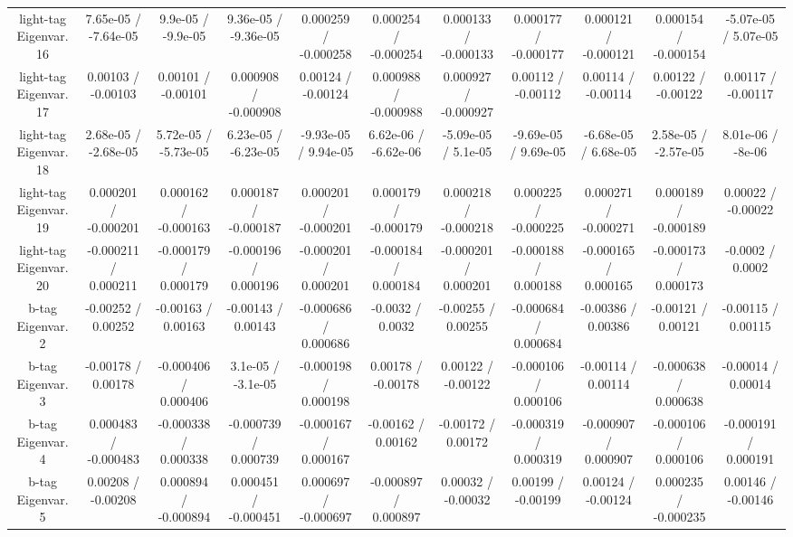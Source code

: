 \begin{table}[htbp]
\begin{center}
\begin{tabular}{|c|c|c|c|c|c|c|c|c|c|c|}
  light-tag Eigenvar. 16 & 7.65e-05 / -7.64e-05 & 9.9e-05 / -9.9e-05 & 9.36e-05 / -9.36e-05 & 0.000259 / -0.000258 & 0.000254 / -0.000254 & 0.000133 / -0.000133 & 0.000177 / -0.000177 & 0.000121 / -0.000121 & 0.000154 / -0.000154 & -5.07e-05 / 5.07e-05 \\ 
  light-tag Eigenvar. 17 & 0.00103 / -0.00103 & 0.00101 / -0.00101 & 0.000908 / -0.000908 & 0.00124 / -0.00124 & 0.000988 / -0.000988 & 0.000927 / -0.000927 & 0.00112 / -0.00112 & 0.00114 / -0.00114 & 0.00122 / -0.00122 & 0.00117 / -0.00117 \\ 
  light-tag Eigenvar. 18 & 2.68e-05 / -2.68e-05 & 5.72e-05 / -5.73e-05 & 6.23e-05 / -6.23e-05 & -9.93e-05 / 9.94e-05 & 6.62e-06 / -6.62e-06 & -5.09e-05 / 5.1e-05 & -9.69e-05 / 9.69e-05 & -6.68e-05 / 6.68e-05 & 2.58e-05 / -2.57e-05 & 8.01e-06 / -8e-06 \\ 
  light-tag Eigenvar. 19 & 0.000201 / -0.000201 & 0.000162 / -0.000163 & 0.000187 / -0.000187 & 0.000201 / -0.000201 & 0.000179 / -0.000179 & 0.000218 / -0.000218 & 0.000225 / -0.000225 & 0.000271 / -0.000271 & 0.000189 / -0.000189 & 0.00022 / -0.00022 \\ 
  light-tag Eigenvar. 20 & -0.000211 / 0.000211 & -0.000179 / 0.000179 & -0.000196 / 0.000196 & -0.000201 / 0.000201 & -0.000184 / 0.000184 & -0.000201 / 0.000201 & -0.000188 / 0.000188 & -0.000165 / 0.000165 & -0.000173 / 0.000173 & -0.0002 / 0.0002 \\ 
  b-tag Eigenvar. 2 & -0.00252 / 0.00252 & -0.00163 / 0.00163 & -0.00143 / 0.00143 & -0.000686 / 0.000686 & -0.0032 / 0.0032 & -0.00255 / 0.00255 & -0.000684 / 0.000684 & -0.00386 / 0.00386 & -0.00121 / 0.00121 & -0.00115 / 0.00115 \\ 
  b-tag Eigenvar. 3 & -0.00178 / 0.00178 & -0.000406 / 0.000406 & 3.1e-05 / -3.1e-05 & -0.000198 / 0.000198 & 0.00178 / -0.00178 & 0.00122 / -0.00122 & -0.000106 / 0.000106 & -0.00114 / 0.00114 & -0.000638 / 0.000638 & -0.00014 / 0.00014 \\ 
  b-tag Eigenvar. 4 & 0.000483 / -0.000483 & -0.000338 / 0.000338 & -0.000739 / 0.000739 & -0.000167 / 0.000167 & -0.00162 / 0.00162 & -0.00172 / 0.00172 & -0.000319 / 0.000319 & -0.000907 / 0.000907 & -0.000106 / 0.000106 & -0.000191 / 0.000191 \\ 
  b-tag Eigenvar. 5 & 0.00208 / -0.00208 & 0.000894 / -0.000894 & 0.000451 / -0.000451 & 0.000697 / -0.000697 & -0.000897 / 0.000897 & 0.00032 / -0.00032 & 0.00199 / -0.00199 & 0.00124 / -0.00124 & 0.000235 / -0.000235 & 0.00146 / -0.00146 \\ 

\end{tabular}
\end{center}
\end{table}
